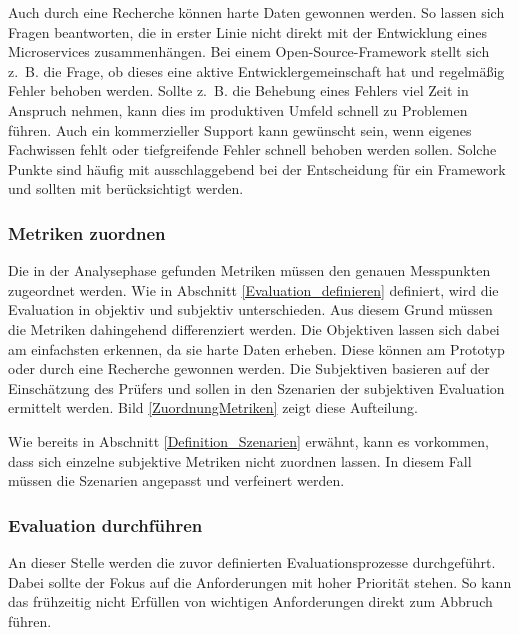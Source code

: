 Auch durch eine Recherche können harte Daten gewonnen werden. So lassen sich Fragen beantworten, die in erster Linie nicht direkt mit der Entwicklung eines Microservices zusammenhängen. Bei einem Open-Source-Framework stellt sich z.~B. die Frage, ob dieses eine aktive Entwicklergemeinschaft hat und regelmäßig Fehler behoben werden. Sollte z.~B. die Behebung eines Fehlers viel Zeit in Anspruch nehmen, kann dies im produktiven Umfeld schnell zu Problemen führen. Auch ein kommerzieller Support kann gewünscht sein, wenn eigenes Fachwissen fehlt oder tiefgreifende Fehler schnell behoben werden sollen. Solche Punkte sind häufig mit ausschlaggebend bei der Entscheidung für ein Framework und sollten mit berücksichtigt werden.

\subsubsection{Metriken zuordnen}\label{Metriken_zuordnen}

Die in der Analysephase gefunden Metriken müssen den genauen Messpunkten zugeordnet werden. Wie in Abschnitt \ref{Evaluation_definieren} definiert, wird die Evaluation in objektiv und subjektiv unterschieden. Aus diesem Grund müssen die Metriken dahingehend differenziert werden. Die Objektiven lassen sich dabei am einfachsten erkennen, da sie harte Daten erheben. Diese können am Prototyp oder durch eine Recherche gewonnen werden.
Die Subjektiven basieren auf der Einschätzung des Prüfers und sollen in den Szenarien der subjektiven Evaluation ermittelt werden. Bild \ref{ZuordnungMetriken} zeigt diese Aufteilung. 


Wie bereits in Abschnitt \ref{Definition_Szenarien} erwähnt, kann es vorkommen, dass sich einzelne subjektive Metriken nicht zuordnen lassen. In diesem Fall müssen die Szenarien angepasst und verfeinert werden. 

\subsubsection{Evaluation durchführen}

An dieser Stelle werden die zuvor definierten Evaluationsprozesse durchgeführt. Dabei sollte der Fokus auf die Anforderungen mit hoher Priorität stehen. So kann das frühzeitig nicht Erfüllen von wichtigen Anforderungen direkt zum Abbruch führen.

